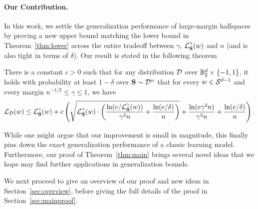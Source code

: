 \paragraph{Our Contribution.}
In this work, we settle the generalization performance of large-margin halfspaces by proving a new upper bound matching the lower bound in Theorem~\ref{thm:lower} across the entire tradeoff between $\gamma$, $\mathcal{L}_{\mathbf{S}}^\gamma(w)$ and $n$ (and is also tight in terms of $\delta$). Our result is stated in the following theorem
\begin{theorem}
\label{thm:main}
There is a constant $c>0$ such that for any distribution $\mathcal{D}$ over $\mathbb{B}_2^d \times \{-1,1\}$, it holds with probability at least $1-\delta$ over $\mathbf{S} \sim \mathcal{D}^n$ that for every $w \in \mathcal{S}^{d-1}$ and every margin $n^{-1/2} \leq \gamma \leq 1$, we have
\[
\mathcal{L}_{\mathcal{D}}(w) \leq \mathcal{L}_{\mathbf{S}}^\gamma(w) + c \left(\sqrt{\mathcal{L}^{\gamma}_{\mathbf{S}}(w) \cdot \left( \frac{ \ln(e/\mathcal{L}^{\gamma}_{\mathbf{S}}(w))}{\gamma^2 n} + \frac{\ln(e/\delta)}{n} \right)} + \frac{\ln(e\gamma^2 n)}{\gamma^2 n} + \frac{\ln(e/\delta)}{n}  \right).
\]
\end{theorem}
While one might argue that our improvement is small in magnitude, this finally pins down the exact generalization performance of a classic learning model. Furthermore, our proof of Theorem~\ref{thm:main} brings several novel ideas that we hope may find further applications in generalization bounds.

We next proceed to give an overview of our proof and new ideas in Section~\ref{sec:overview}, before giving the full details of the proof in Section~\ref{sec:mainproof}.

